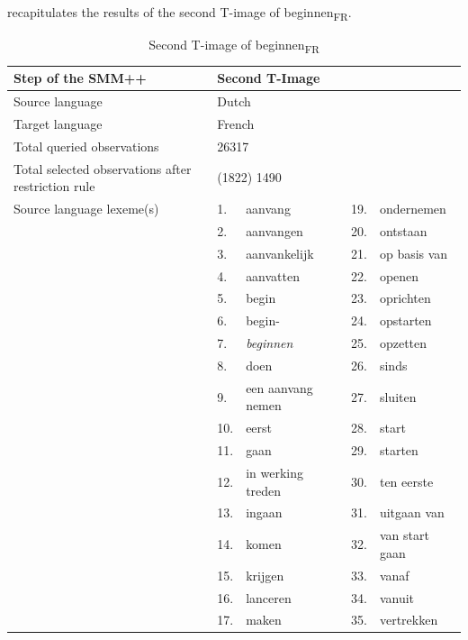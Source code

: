  recapitulates the results of the second T-image of beginnen\textsubscript{FR}.

\begin{table}
\caption{Second T-image of beginnen\textsubscript{FR}\label{tab:3:11}}
\small
\begin{tabularx}{\textwidth}{p{}lXlX}
\lsptoprule
Step of the SMM++ & \multicolumn{4}{l}{Second T-Image}\\ \midrule
\rowcolor{lsLightGray} Source language & \multicolumn{4}{l}{ Dutch}\\
Target language & \multicolumn{4}{l}{ French}\\
\rowcolor{lsLightGray} Total queried observations & \multicolumn{4}{l}{26317}\\
Total selected observations after restriction rule & \multicolumn{4}{l}{ (1822) 1490\footnotemark{}}\\
\rowcolor{lsLightGray} Source language lexeme(s) & 1.& aanvang & 19.& ondernemen\\
\rowcolor{lsLightGray}& 2.& aanvangen & 20.& ontstaan\\
\rowcolor{lsLightGray}& 3.& aanvankelijk & 21.& op basis van\\
\rowcolor{lsLightGray}& 4.& aanvatten & 22.& openen\\
\rowcolor{lsLightGray}& 5.& begin & 23.& oprichten\\
\rowcolor{lsLightGray}& 6.& begin- & 24.& opstarten\\
\rowcolor{lsLightGray}& 7.& \textit{beginnen} & 25.& opzetten\\
\rowcolor{lsLightGray}& 8.& doen & 26.& sinds\\
\rowcolor{lsLightGray}& 9.& een aanvang nemen & 27.& sluiten\\
\rowcolor{lsLightGray}& 10.& eerst & 28.& start\\
\rowcolor{lsLightGray}& 11.& gaan & 29.& starten\\
\rowcolor{lsLightGray}& 12.& in werking treden & 30.& ten eerste\\
\rowcolor{lsLightGray}& 13.& ingaan & 31.& uitgaan van\\
\rowcolor{lsLightGray}& 14.& komen & 32.& van start gaan\\
\rowcolor{lsLightGray}& 15.& krijgen & 33.& vanaf\\
\rowcolor{lsLightGray}& 16.& lanceren & 34.& vanuit\\
\rowcolor{lsLightGray}& 17.& maken & 35.& vertrekken\\

\end{tabularx}
\end{table}
